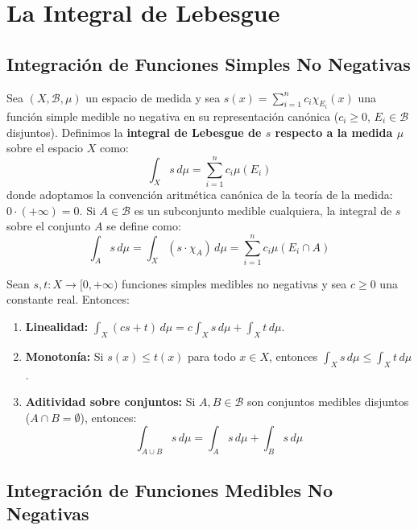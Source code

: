 \section{La Integral de Lebesgue}

\subsection{Integración de Funciones Simples No Negativas}

\begin{definicion}
	Sea $(X, \mathcal{B}, \mu)$ un espacio de medida y sea $s(x) = \sum_{i=1}^n c_i \chi_{E_i}(x)$ una función simple medible no negativa en su representación canónica ($c_i \ge 0$, $E_i \in \mathcal{B}$ disjuntos). Definimos la \textbf{integral de Lebesgue de $s$ respecto a la medida $\mu$} sobre el espacio $X$ como:
	$$ \int_X s \, d\mu = \sum_{i=1}^n c_i \mu(E_i) $$
	donde adoptamos la convención aritmética canónica de la teoría de la medida: $0 \cdot (+\infty) = 0$.
	Si $A \in \mathcal{B}$ es un subconjunto medible cualquiera, la integral de $s$ sobre el conjunto $A$ se define como:
	$$ \int_A s \, d\mu = \int_X (s \cdot \chi_A) \, d\mu = \sum_{i=1}^n c_i \mu(E_i \cap A) $$
\end{definicion}

\begin{lema}
	Sean $s, t: X \to [0, +\infty)$ funciones simples medibles no negativas y sea $c \ge 0$ una constante real. Entonces:
	\begin{enumerate}[1)]
		\item \textbf{Linealidad:} $\int_X (cs + t) \, d\mu = c \int_X s \, d\mu + \int_X t \, d\mu$.
		\item \textbf{Monotonía:} Si $s(x) \le t(x)$ para todo $x \in X$, entonces $\int_X s \, d\mu \le \int_X t \, d\mu$.
		\item \textbf{Aditividad sobre conjuntos:} Si $A, B \in \mathcal{B}$ son conjuntos medibles disjuntos ($A \cap B = \emptyset$), entonces:
		$$ \int_{A \cup B} s \, d\mu = \int_A s \, d\mu + \int_B s \, d\mu $$
	\end{enumerate}
\end{lema}

\subsection{Integración de Funciones Medibles No Negativas}

